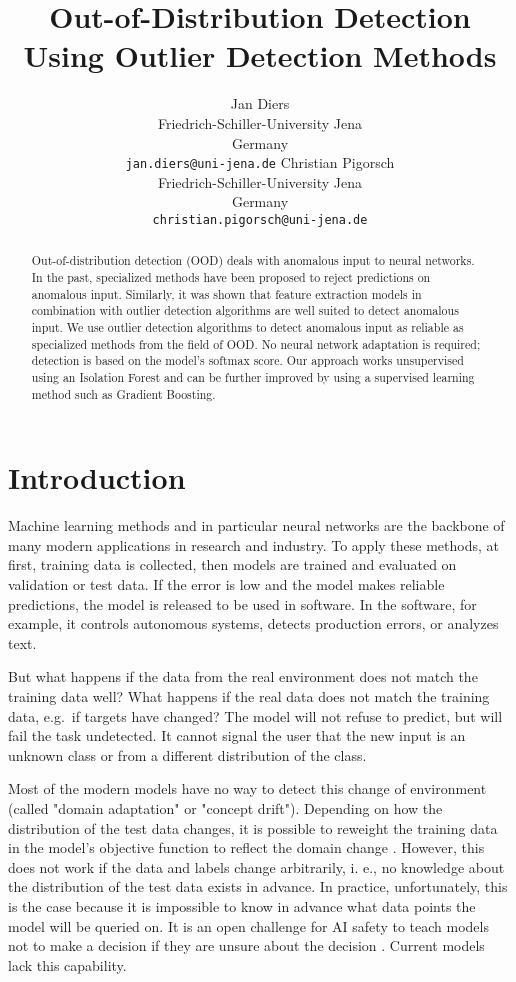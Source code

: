 \documentclass{article}
\title{Out-of-Distribution Detection Using Outlier Detection Methods}
\author{
    Jan Diers \\ 
    Friedrich-Schiller-University Jena \\
    Germany \\ 
    \texttt{jan.diers@uni-jena.de}
   \And
    Christian Pigorsch \\ 
    Friedrich-Schiller-University Jena \\
    Germany \\ 
    \texttt{christian.pigorsch@uni-jena.de}
}
\begin{document}
\maketitle

\begin{abstract}
Out-of-distribution detection (OOD) deals with anomalous input to neural networks. In the past, specialized methods have been proposed to reject predictions on anomalous input. Similarly, it was shown that feature extraction models in combination with outlier detection algorithms are well suited to detect anomalous input.  We use outlier detection algorithms to detect anomalous input as reliable as specialized methods from the field of OOD. No neural network adaptation is required; detection is based on the model's softmax score. Our approach works unsupervised using an Isolation Forest and can be further improved by using a supervised learning method such as Gradient Boosting.
\end{abstract}





\section{Introduction}

Machine learning methods and in particular neural networks are the backbone of many modern applications in research and industry. To apply these methods, at first, training data is collected, then models are trained and evaluated on validation or test data. If the error is low and the model makes reliable predictions, the model is released to be used in software. In the software, for example, it controls autonomous systems, detects production errors, or analyzes text.

But what happens if the data from the real environment does not match the training data well? What happens if the real data does not match the training data, e.g.~if targets have changed? The model will not refuse to predict, but will fail the task undetected. It cannot signal the user that the new input is an unknown class or from a different distribution of the class.

Most of the modern models have no way to detect this change of environment (called "domain adaptation" or "concept drift"). Depending on how the distribution of the test data changes, it is possible to reweight the training data in the model's objective function to reflect the domain change \cite{KunZhang.2013}. However, this does not work if the data and labels change arbitrarily, i. e., no knowledge about the distribution of the test data exists in advance. In practice, unfortunately, this is the case because it is impossible to know in advance what data points the model will be queried on. It is an open challenge for AI safety to teach models not to make a decision if they are unsure about the decision \cite{Amodei.2016}. Current models lack this capability.
\end{document}
